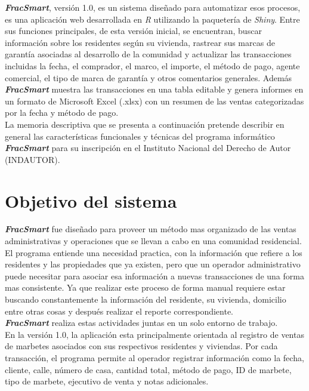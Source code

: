 \documentclass{article}
\begin{document}
\quad\quad \textbf{\textit{FracSmart}}, versión 1.0, es un sistema diseñado para automatizar esos procesos, es una aplicación web desarrollada en \textit{R} utilizando la paquetería de \textit{Shiny}. Entre sus funciones principales, de esta versión inicial, se encuentran, buscar información sobre los residentes según su vivienda, rastrear sus marcas de garantía asociadas al desarrollo de la comunidad y actualizar las transacciones incluidas la fecha, el comprador, el marco, el importe, el método de pago, agente comercial, el tipo de marca de garantía y otros comentarios generales. Además \textbf{\textit{FracSmart}} muestra las transacciones en una tabla editable y genera informes en un formato de Microsoft Excel (.xlsx) con un resumen de las ventas categorizadas por la fecha y método de pago. \\

\quad\quad La memoria descriptiva que se presenta a continuación pretende describir en general las características funcionales y técnicas del programa informático \textbf{\textit{FracSmart}} para su inscripción en el Instituto Nacional del Derecho de Autor (INDAUTOR).



\newpage
\section{Objetivo del sistema}
\quad\quad \textbf{\textit{FracSmart}} fue diseñado para proveer un método mas organizado de las ventas administrativas y operaciones que se llevan a cabo en una comunidad residencial. \\

\quad\quad El programa entiende una necesidad practica, con la información que refiere a los residentes y las propiedades que ya existen, pero que un operador administrativo puede necesitar para asociar esa información a nuevas transacciones de una forma mas consistente. Ya que realizar este proceso de forma manual requiere estar buscando constantemente la información del residente, su vivienda, domicilio entre otras cosas y después realizar el reporte correspondiente. \\

\quad\quad \textbf{\textit{FracSmart}} realiza estas actividades juntas en un solo entorno de trabajo.\\

\quad\quad En la versión 1.0, la aplicación esta principalmente orientada al registro de ventas de marbetes asociados con sus respectivos residentes y viviendas. Por cada transacción, el programa permite al operador registrar información como la fecha, cliente, calle, número de casa, cantidad total, método de pago, ID de marbete, tipo de marbete, ejecutivo de venta y notas adicionales.\\
\end{document}
